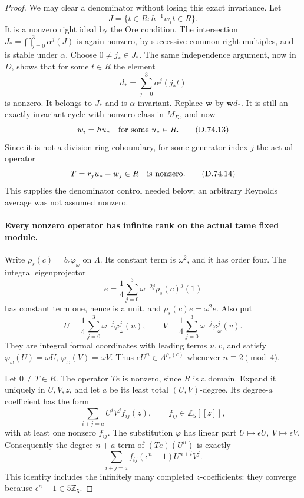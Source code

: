\begin{proof}
We may clear a denominator without losing this exact
invariance. Let
\[
 J=\{t\in R:h^{-1}w_i t\in R\}.
 \]
It is a nonzero right ideal by the Ore condition.
The intersection \(J_*=\bigcap_{j=0}^3\alpha^j(J)\)
is again nonzero, by successive common right multiples,
and is stable under \(\alpha\). Choose \(0\ne j_*\in J_*\).
The same independence argument, now in \(D\), shows
that for some \(t\in R\) the element
\[
                    d_*=\sum_{j=0}^3\alpha^j(j_*t)
 \]
is nonzero. It belongs to \(J_*\) and is
\(\alpha\)-invariant. Replace \(\mathbf w\) by
\(\mathbf w d_*\). It is still an exactly invariant
cycle with nonzero class in \(M_D\), and now
\[
             w_i=h u_*\quad\hbox{for some }u_*\in R.
                                                        \tag{D.74.13}
\]
Since it is not a division-ring coboundary, for some
generator index \(j\) the actual operator
\[
                  T=r_j u_*-w_j\in R
                               \quad\hbox{is nonzero}. \tag{D.74.14}
\]
This supplies the denominator control needed below;
an arbitrary Reynolds average was not assumed nonzero.

\paragraph{Every nonzero operator has infinite rank on the actual tame fixed module.}
Write \(\rho_s(c)=b_c\varphi_\omega\) on \(\Lambda\).
Its constant term is \(\omega^2\), and it has
order four. The integral eigenprojector
\[
       e=\frac14\sum_{j=0}^3\omega^{-2j}\rho_s(c)^j(1)
                                                        \tag{D.74.15}
\]
has constant term one, hence is a unit, and
\(\rho_s(c)e=\omega^2e\).
Also put
\[
 U=\frac14\sum_{j=0}^3\omega^{-j}\varphi_\omega^j(u),
 \qquad
 V=\frac14\sum_{j=0}^3\omega^{-j}\varphi_\omega^j(v).
                                                        \tag{D.74.16}
\]
They are integral formal coordinates with leading
terms \(u,v\), and satisfy
\(\varphi_\omega(U)=\omega U\),
\(\varphi_\omega(V)=\omega V\).
Thus \(eU^n\in\Lambda^{\rho_s(c)}\) whenever
\(n\equiv2\pmod4\).

Let \(0\ne T\in R\). The operator \(Te\) is nonzero,
since \(R\) is a domain. Expand it uniquely in
\(U,V,z\), and let \(a\) be its least total
\((U,V)\)-degree. Its degree-\(a\) coefficient has
the form
\[
                  \sum_{i+j=a}U^iV^j f_{ij}(z),
          \qquad f_{ij}\in\mathbb Z_5[[z]],
 \]
with at least one nonzero \(f_{ij}\). The substitution
\(\varphi\) has linear part
\(U\mapsto\epsilon U,\ V\mapsto\epsilon V\).
Consequently the degree-\(n+a\) term of
\((Te)(U^n)\) is exactly
\[
       \sum_{i+j=a}f_{ij}(\epsilon^n-1)U^{n+i}V^j.
                                                        \tag{D.74.17}
\]
This identity includes the infinitely many completed
\(z\)-coefficients: they converge because
\(\epsilon^n-1\in5\mathbb Z_5\).


\end{proof}

